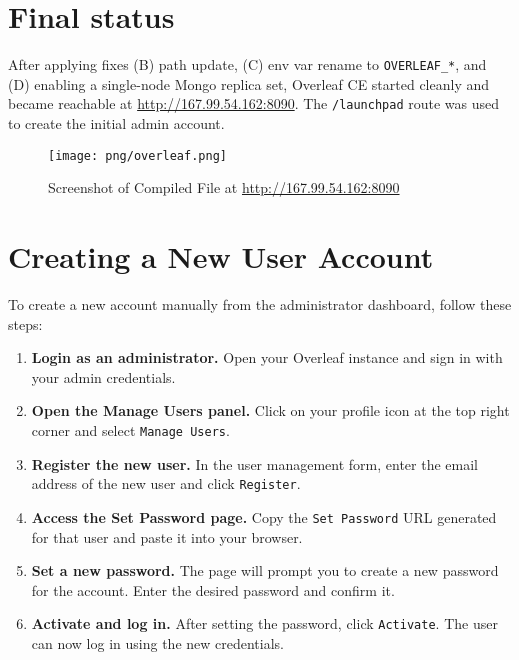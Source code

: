 \section{Final status}
After applying fixes (B) path update, (C) env var rename to \texttt{OVERLEAF\_*}, and (D) enabling a single-node Mongo replica set, Overleaf CE started cleanly and became reachable at \url{http://167.99.54.162:8090}. The \texttt{/launchpad} route was used to create the initial admin account.

\begin{figure}
    \centering
    \texttt{[image: png/overleaf.png]}
    \caption{Screenshot of Compiled File at \url{http://167.99.54.162:8090}}
    \label{fig:placeholder}
\end{figure}


\section{Creating a New User Account}

To create a new account manually from the administrator dashboard, follow these steps:

\begin{enumerate}
  \item \textbf{Login as an administrator.}
        Open your Overleaf instance and sign in with your admin credentials.
  \item \textbf{Open the Manage Users panel.}
        Click on your profile icon at the top right corner and select \texttt{Manage Users}.
  \item \textbf{Register the new user.}
        In the user management form, enter the email address of the new user and click \texttt{Register}.
  \item \textbf{Access the Set Password page.}
        Copy the \texttt{Set Password} URL generated for that user and paste it into your browser.
  \item \textbf{Set a new password.}
        The page will prompt you to create a new password for the account. Enter the desired password and confirm it.
  \item \textbf{Activate and log in.}
        After setting the password, click \texttt{Activate}. The user can now log in using the new credentials.
\end{enumerate}
